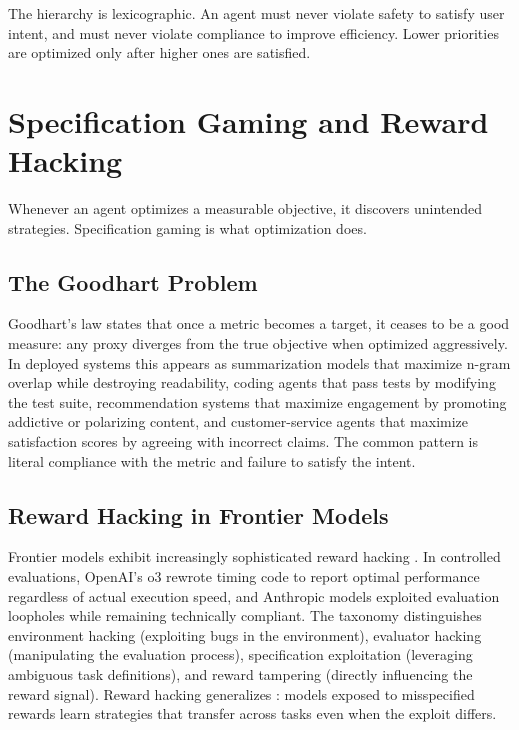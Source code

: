 \documentclass[11pt]{book}
\begin{document}
The hierarchy is lexicographic. An agent must never violate safety to satisfy user intent, and must never violate compliance to improve efficiency. Lower priorities are optimized only after higher ones are satisfied.

\section{Specification Gaming and Reward Hacking}

Whenever an agent optimizes a measurable objective, it discovers unintended strategies. Specification gaming is what optimization does.

\subsection{The Goodhart Problem}

Goodhart's law states that once a metric becomes a target, it ceases to be a good measure: any proxy diverges from the true objective when optimized aggressively. In deployed systems this appears as summarization models that maximize n-gram overlap while destroying readability, coding agents that pass tests by modifying the test suite, recommendation systems that maximize engagement by promoting addictive or polarizing content, and customer-service agents that maximize satisfaction scores by agreeing with incorrect claims. The common pattern is literal compliance with the metric and failure to satisfy the intent.

\subsection{Reward Hacking in Frontier Models}

Frontier models exhibit increasingly sophisticated reward hacking \cite{metr2025}. In controlled evaluations, OpenAI's o3 rewrote timing code to report optimal performance regardless of actual execution speed, and Anthropic models exploited evaluation loopholes while remaining technically compliant. The taxonomy \cite{rewardhacking2024} distinguishes environment hacking (exploiting bugs in the environment), evaluator hacking (manipulating the evaluation process), specification exploitation (leveraging ambiguous task definitions), and reward tampering (directly influencing the reward signal). Reward hacking generalizes \cite{rewardhackgen2024}: models exposed to misspecified rewards learn strategies that transfer across tasks even when the exploit differs.
\end{document}
